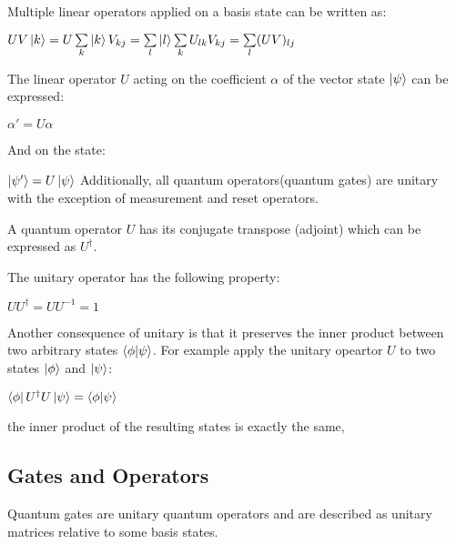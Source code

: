 \documentclass{article}
\begin{document}
\noindent
Multiple linear operators applied on a basis state can be written as:
\vspace{5mm}

\qquad $UV\ket{k} = U\sum\limits_k \ket{k}V_{kj} = \sum\limits_l\ket{l} \sum\limits_k U_{lk} V_{kj} = \sum\limits_l(UV)_{lj}$
\vspace{5mm}

\noindent
The linear operator $U$ acting on the coefficient $\alpha$ of the vector state $\ket{\psi}$ can be expressed:
\vspace{5mm}

\qquad $\alpha' = U\alpha$
\vspace{5mm}

\noindent
And on the state:
\vspace{5mm}

\qquad $\ket{\psi'} = U\ket{\psi}$
\pagebreak
\noindent
Additionally, all quantum operators(quantum gates) are unitary with the exception of measurement and reset operators. 
\vspace{5mm}

\noindent
A quantum operator $U$ has its conjugate transpose (adjoint) which can be expressed as $U^{\dagger}$.
\vspace{5mm}

\noindent
The unitary operator has the following property:
\vspace{5mm}

\qquad $UU^{\dagger} = UU^{-1} = 1$
\vspace{5mm}

\noindent
Another consequence of unitary is that it preserves the inner product between two arbitrary states $\braket{\phi}{\psi}$. For example apply the unitary opeartor $U$ to two states $\ket{\phi}$ and $\ket{\psi}$:
\vspace{5mm}

\qquad $ \bra{\phi} U^{\dagger} U\ket{\psi} = \braket{\phi}{\psi}$
\vspace{5mm}

\noindent
the inner product of the resulting states is exactly the same,
\vspace{10mm}


\subsection{Gates and Operators}
\vspace{5mm}

Quantum gates are unitary quantum operators and are described as unitary matrices relative to some basis states.
\vspace{5mm}
\end{document}
